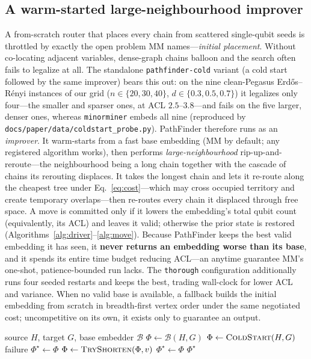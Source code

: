 \documentclass[acmsmall,anonymous,nonacm]{acmart}
\begin{document}
\subsection{A warm-started large-neighbourhood improver}
\label{sec:improver}
A from-scratch router that places every chain from scattered single-qubit seeds
is throttled by exactly the open problem MM names---\emph{initial placement}.
Without co-locating adjacent variables, dense-graph chains balloon and the search
often fails to legalize at all. The standalone \texttt{pathfinder-cold} variant
(a cold start followed by the same improver) bears this out: on the nine
clean-Pegasus Erd\H{o}s--R\'enyi instances of our grid
($n\in\{20,30,40\}$, $d\in\{0.3,0.5,0.7\}$) it legalizes only four---the smaller
and sparser ones, at ACL $2.5$--$3.8$---and fails on the five larger, denser ones,
whereas
\texttt{minorminer} embeds all nine
(reproduced by \texttt{docs/paper/data/coldstart\_probe.py}).
PathFinder therefore runs as an \emph{improver}. It warm-starts from a fast base
embedding (MM by default; any registered algorithm works), then performs
\emph{large-neighbourhood} rip-up-and-reroute---the neighbourhood being a long
chain together with the cascade of chains its rerouting displaces. It takes the
longest chain and lets it re-route along the cheapest tree under
Eq.~\eqref{eq:cost}---which may cross occupied territory and create temporary
overlaps---then re-routes every chain it displaced through free space. A move is
committed only if it lowers the embedding's total qubit count (equivalently, its
ACL) and leaves it valid; otherwise the prior state is restored
(Algorithms~\ref{alg:driver}--\ref{alg:move}). Because PathFinder keeps the best
valid embedding it has seen, it \textbf{never returns an embedding worse than its
base}, and it spends its entire time budget reducing ACL---an anytime guarantee
MM's one-shot, patience-bounded run lacks. The \texttt{thorough} configuration
additionally runs four seeded restarts and keeps the best, trading wall-clock for
lower ACL and variance. When no valid base is available, a fallback builds the
initial embedding from scratch in breadth-first vertex order under the same
negotiated cost; uncompetitive on its own, it exists only to guarantee an output.

\begin{algorithm}[t]
\caption{PathFinder (driver)}
\label{alg:driver}
\begin{algorithmic}[1]
\Require source $H$, target $G$, base embedder $\mathcal{B}$
\State $\Phi \gets \mathcal{B}(H,G)$ 
 $\Phi \gets \textsc{ColdStart}(H,G)$ 
\EndIf
{} \Return failure \EndIf
\State $\Phi^\star \gets \Phi$ 
\Repeat
     \State $\Phi \gets \textsc{TryShorten}(\Phi, v)$ 
      $\Phi^\star \gets \Phi$ \EndIf
  \EndFor
{}
\State \Return $\Phi^\star$
\end{algorithmic}
\end{algorithm}
\end{document}
